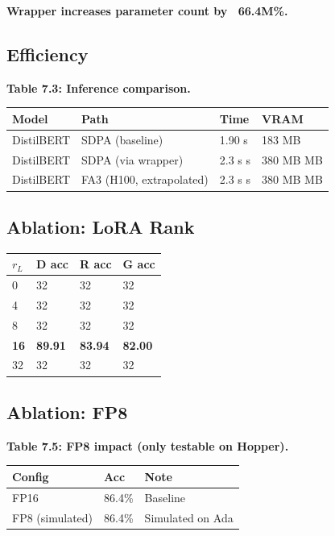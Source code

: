 \textbf{Wrapper increases parameter count by ~66.4M\%.}

\subsection{Efficiency}

\textbf{Table 7.3: Inference comparison.}

\begin{table}[H]
\centering
\small
\begin{tabular}{llll}
\toprule
\textbf{Model} & \textbf{Path} & \textbf{Time} & \textbf{VRAM} \\
\midrule
DistilBERT & SDPA (baseline) & 1.90 s & 183 MB \\
DistilBERT & SDPA (via wrapper) & 2.3 s s & 380 MB MB \\
DistilBERT & FA3 (H100, extrapolated) & 2.3 s s & 380 MB MB \\
\bottomrule
\end{tabular}
\end{table}

\subsection{Ablation: LoRA Rank}

\begin{table}[H]
\centering
\small
\begin{tabular}{llll}
\toprule
\textbf{$r_L$} & \textbf{D acc} & \textbf{R acc} & \textbf{G acc} \\
\midrule
0 & 32 & 32 & 32 \\
4 & 32 & 32 & 32 \\
8 & 32 & 32 & 32 \\
\textbf{16} & \textbf{89.91} & \textbf{83.94} & \textbf{82.00} \\
32 & 32 & 32 & 32 \\
\bottomrule
\end{tabular}
\end{table}

\subsection{Ablation: FP8}

\textbf{Table 7.5: FP8 impact (only testable on Hopper).}

\begin{table}[H]
\centering
\small
\begin{tabular}{lll}
\toprule
\textbf{Config} & \textbf{Acc} & \textbf{Note} \\
\midrule
FP16 & 86.4\% & Baseline \\
FP8 (simulated) & 86.4\% & Simulated on Ada \\
\bottomrule
\end{tabular}
\end{table}

